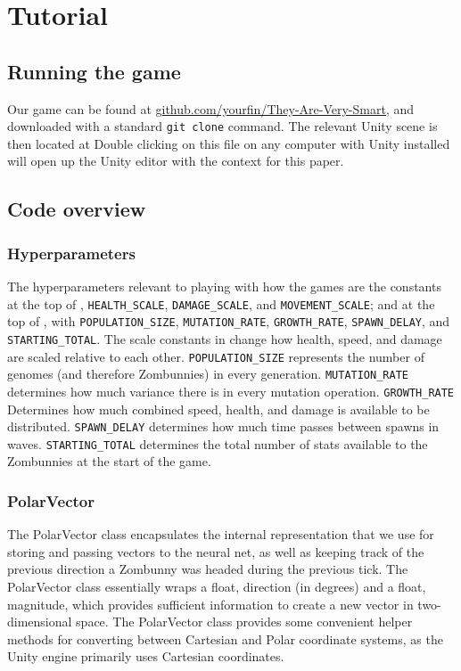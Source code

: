 \documentclass[letterpaper]{article}
\begin{document}
\section{Tutorial}

\subsection{Running the game}
Our game can be found at
\href{https://github.com/YourFin/They-Are-Very-Smart}{github.com/yourfin/They-Are-Very-Smart},
and downloaded with a standard \texttt{git clone} command. The relevant Unity
scene is then located at
Double clicking on this file on any computer with Unity installed will open up
the Unity editor with the context for this paper.

\subsection{Code overview}
\subsubsection{Hyperparameters}
The hyperparameters relevant to playing with how the games are the constants at
the top of , \texttt{HEALTH\_SCALE},
\texttt{DAMAGE\_SCALE}, and \texttt{MOVEMENT\_SCALE}; and at the top of
, with
\texttt{POPULATION\_SIZE}, \texttt{MUTATION\_RATE}, \texttt{GROWTH\_RATE},
\texttt{SPAWN\_DELAY}, and \texttt{STARTING\_TOTAL}. The scale constants in
 change how health, speed, and damage are scaled relative to
each other. \texttt{POPULATION\_SIZE} represents the number of genomes (and
therefore Zombunnies) in every generation. \texttt{MUTATION\_RATE} determines how
much variance there is in every mutation operation. \texttt{GROWTH\_RATE}
Determines how much combined speed, health, and damage is available to be
distributed. \texttt{SPAWN\_DELAY} determines how much time passes between spawns
in waves. \texttt{STARTING\_TOTAL} determines the total number of stats available
to the Zombunnies at the start of the game.

\subsubsection{PolarVector}
The PolarVector class encapsulates the internal representation that we use for storing and passing vectors to the neural net, as well as keeping track of the previous direction a Zombunny was headed during the previous tick. The PolarVector class essentially wraps a float, direction (in degrees) and a float, magnitude, which provides sufficient information to create a new vector in two-dimensional space. The PolarVector class provides some convenient helper methods for converting between Cartesian and Polar coordinate systems, as the Unity engine primarily uses Cartesian coordinates.
\end{document}
